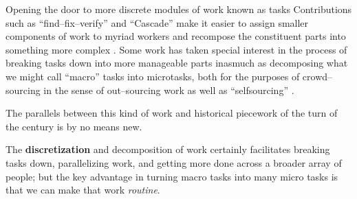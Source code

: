 \documentclass{sigchi}
\newcommand{\msb}[1]{{\color{PineGreen}[MSB: #1]}}
\begin{document}






Opening the door to more discrete modules of work known as tasks 
Contributions such as
``find--fix--verify'' %
and
``Cascade'' %
make it easier to assign smaller components of work to myriad workers and
recompose the constituent parts into something more complex
\cite{bernstein2015soylent,chilton2013cascade}.
Some work has taken special interest in the process of breaking tasks down into more manageable parts
inasmuch as decomposing what we might call ``macro'' tasks into microtasks,
both for the purposes of crowd--sourcing in the sense of out--sourcing work
as well as ``selfsourcing''
\cite{cheng2015break,teevan2014selfsourcing}.

The parallels between this kind of work and
historical piecework of the turn of the  century
is by no means new.

The \textbf{discretization} and decomposition of work certainly facilitates
breaking tasks down,
parallelizing work,
and getting more done across a broader array of people;
but the key advantage in turning macro tasks 
into many micro tasks is that we can make that work \textit{routine}.
\end{document}
